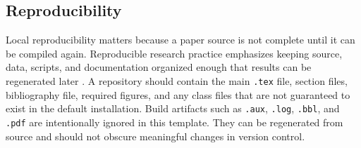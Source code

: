 \subsection{Reproducibility}

Local reproducibility matters because a paper source is not complete until it can be compiled again. Reproducible research practice emphasizes keeping source, data, scripts, and documentation organized enough that results can be regenerated later \cite{peng2011,wilson2017}. A repository should contain the main \texttt{.tex} file, section files, bibliography file, required figures, and any class files that are not guaranteed to exist in the default installation. Build artifacts such as \texttt{.aux}, \texttt{.log}, \texttt{.bbl}, and \texttt{.pdf} are intentionally ignored in this template. They can be regenerated from source and should not obscure meaningful changes in version control.
